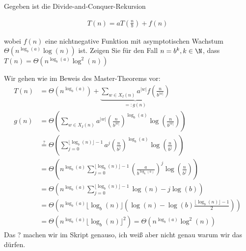 
\begin{exercise}

Gegeben ist die Divide-and-Conquer-Rekursion

\begin{align*}
  T(n) = aT\left(\frac{n}{b}\right) + f(n)
\end{align*}

wobei $f(n)$ eine nichtnegative Funktion mit asymptotischen Wachstum $\Theta(n^{\log_b(a)}\log (n))$ ist. Zeigen Sie für den Fall $n = b^k, k \in \N$, dass $T(n) = \Theta(n^{\log_b(a)}\log^2 (n))$

\end{exercise}


\begin{solution}
Wir gehen wie im Beweis des Master-Theorems vor:
\begin{align*}
  T(n) &= \Theta\left(n^{\log_b(a)}\right) +
  \underbrace{\sum_{w \in X_I(n)}a^{|w|}f\left(\frac{n}{b^{|w|}}\right)}_{=: g(n)} \\
  g(n) &= \Theta\left(\sum_{w \in X_I(n)}a^{|w|}
  \left(\frac{n}{b^{|w|}}\right)^{\log_b(a)}\log \left(\frac{n}{b^{|w|}}\right)\right) \\
  &\stackrel{?}{=} \Theta\left(\sum_{j = 0}^{\lfloor \log_b(n) \rfloor -1}a^{j}
  \left(\frac{n}{b^{j}}\right)^{\log_b(a)}\log \left(\frac{n}{b^{j}}\right)\right) \\
  &= \Theta\left(n^{\log_b(a)}\sum_{j = 0}^{\lfloor \log_b(n) \rfloor -1}
  \left(\frac{a}{b^{\log_b(a)}}\right)^j \log \left(\frac{n}{b^{j}}\right)\right) \\
  &= \Theta\left(n^{\log_b(a)}\sum_{j = 0}^{\lfloor \log_b(n) \rfloor -1}
  \log(n) - j\log(b)\right) \\
  &= \Theta\left(n^{\log_b(a)}\lfloor \log_b(n) \rfloor\left(\log(n) -
  \log(b)\frac{\lfloor \log_b(n) \rfloor -1}{2}\right)\right) \\
  &= \Theta\left(n^{\log_b(a)}\lfloor \log_b(n) \rfloor^2\right)
  =  \Theta\left(n^{\log_b(a)}\log^2(n)\right)
\end{align*}
Das ? machen wir im Skript genauso, ich weiß aber nicht genau warum wir das dürfen.
\end{solution}


